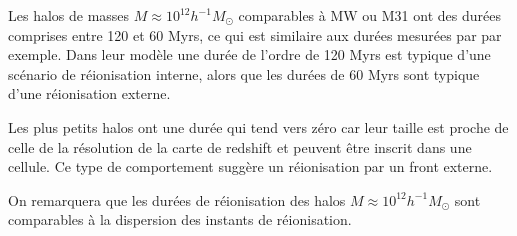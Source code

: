 Les halos de masses $M \approx 10^{12} h^{-1}M_\odot$ comparables à MW ou M31 ont des durées comprises entre 120 et 60 Myrs, ce qui est similaire aux durées mesurées par \cite{ocvirk_reionization_2014} par exemple.
Dans leur modèle une durée de l'ordre de 120 Myrs est typique d'une scénario de réionisation interne, alors que les durées de 60 Myrs sont typique d'une réionisation externe.

Les plus petits halos ont une durée qui tend vers zéro car leur taille est proche de celle de la résolution de la carte de redshift et peuvent être inscrit dans une cellule.
Ce type de comportement suggère un réionisation par un front externe.

On remarquera que les durées de réionisation des halos $M \approx 10^{12} h^{-1}M_\odot$ sont comparables à la dispersion des instants de réionisation.




%
%


